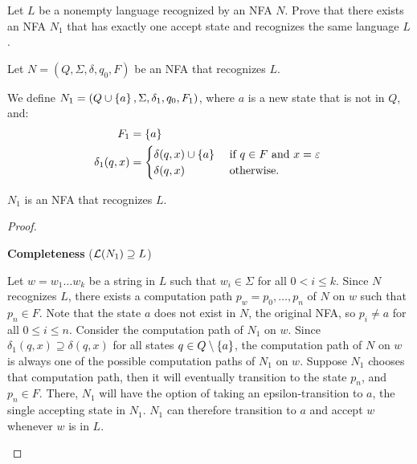 \begin{problem}
  \begin{enumalph}
    \item Let $L$ be a nonempty language recognized by an NFA $N$.
      Prove that there exists an NFA $N_1$ that has exactly one accept state
      and recognizes the same language $L$.
      \begin{Answer}
        Let $N = (Q, \Sigma, \delta, q_0, F)$ be an NFA that recognizes $L$.
        
        \step
        We define $N_1 = (Q \cup \left\{a\right\}, \Sigma, \delta_1, q_0, F_1)$,
        where $a$ is a new state that is not in $Q$, and:
        \begin{align*}
          F_1 &= \left\{a\right\} \\
          \delta_1(q, x) &= \begin{cases}
            \delta(q, x) \cup \left\{a\right\} &\text{ if $q \in F$ and $x = \varepsilon$ }\\
            \delta(q, x) & \text{ otherwise. }
          \end{cases}
        \end{align*}
        \begin{claim}
          $N_1$ is an NFA that recognizes $L$.
          \begin{proof}
            
            \step
            \begin{enumroman}
              \item \textbf{Completeness} ($\mathcal{L}(N_1) \supseteq L$)

                \step
                Let $w = w_1\ldots w_k$ be a string in $L$
                such that $w_i \in \Sigma$ for all $0 < i \le k$.
                Since $N$ recognizes $L$,
                there exists a computation path $p_w = p_0,\ldots,p_n$
                of $N$ on $w$ such that $p_n \in F$.
                Note that the state $a$ does not exist in $N$, the original NFA,
                so $p_i \neq a$ for all $0 \le i \le n$.
                Consider the computation path of $N_1$ on $w$.
                Since $\delta_1(q, x) \supseteq \delta(q, x)$
                for all states $q \in Q \setminus \left\{a\right\}$,
                the computation path of $N$ on $w$ is always one of the possible
                computation paths of $N_1$ on $w$.
                Suppose $N_1$ chooses that computation path, then it will eventually
                transition to the state $p_n$, and $p_n \in F$.
                There, $N_1$ will have the option of taking an epsilon-transition
                to $a$, the single accepting state in $N_1$.
                $N_1$ can therefore transition to $a$ and accept $w$
                whenever $w$ is in $L$.
                

\end{enumroman}
\end{proof}
\end{claim}
\end{Answer}
\end{enumalph}
\end{problem}
